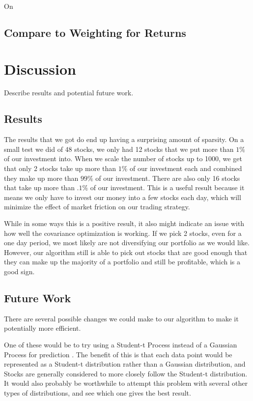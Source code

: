 \documentclass{article}
\begin{document}
On 

\subsection{Compare to Weighting for Returns}



\section{Discussion}
\label{discuss}

Describe results and potential future work.

\subsection{Results}

The results that we got do end up having a surprising amount of sparsity.  On a small test we did of 48 stocks, we only had 12 stocks that we put more than $1\%$ of our investment into.  When we scale the number of stocks up to 1000, we get that only 2 stocks take up more than $1\%$ of our investment each and combined they make up more than $99\%$ of our investment. There are also only 16 stocks that take up more than $.1\%$ of our investment.  This is a useful result because it means we only have to invest our money into a few stocks each day, which will minimize the effect of market friction on our trading strategy.

While in some ways this is a positive result, it also might indicate an issue with how well the covariance optimization is working.  If we pick 2 stocks, even for a one day period, we most likely are not diversifying our portfolio as we would like.  However, our algorithm still is able to pick out stocks that are good enough that they can make up the majority of a portfolio and still be profitable, which is a good sign.

\subsection{Future Work}

There are several possible changes we could make to our algorithm to make it potentially more efficient.  

One of these would be to try using a Student-t Process instead of a Gaussian Process for prediction \cite{student-t}.  The benefit of this is that each data point would be represented as a Student-t distribution rather than a Gaussian distribution, and Stocks are generally considered to more closely follow the Student-t distribution.  It would also probably be worthwhile to attempt this problem with several other types of distributions, and see which one gives the best result.  
\end{document}
